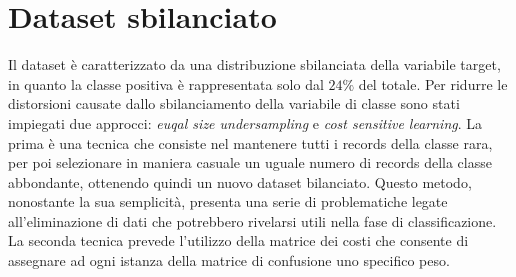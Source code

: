 \documentclass[fleqn,10pt]{SelfArx}
\begin{document}
\begin{table}[]
\caption{Aggregazione delle modalità della variabile occupation}
\label{tab:my-table}
\end{table}
\section{Dataset sbilanciato}
Il dataset è caratterizzato da una distribuzione sbilanciata della variabile target, in quanto la classe positiva è rappresentata solo dal $24\%$ del totale. Per ridurre le distorsioni causate dallo sbilanciamento della variabile di classe sono stati impiegati due approcci: \textit{euqal size undersampling} e \textit{cost sensitive learning}. La prima è una tecnica che consiste nel mantenere tutti i records della classe rara, per poi selezionare in maniera casuale un uguale numero di records della classe abbondante, ottenendo quindi un nuovo dataset bilanciato. Questo metodo, nonostante la sua semplicità, presenta una serie di problematiche legate all'eliminazione di dati che potrebbero rivelarsi utili nella fase di classificazione.
La seconda tecnica prevede l'utilizzo della matrice dei costi che consente di assegnare ad ogni istanza della matrice di confusione uno specifico peso.
\end{document}
